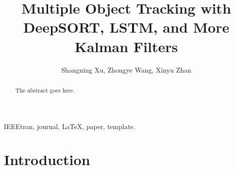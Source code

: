 \documentclass[conference]{IEEEtran}
\begin{document}
%
\title{Multiple Object Tracking with DeepSORT, LSTM, and More Kalman Filters}
%
%
%

\author{
    Shangning Xu,
    Zhongye Wang,
    Xinyu Zhan
}

%


\maketitle

\begin{abstract}
The abstract goes here.
\end{abstract}

\begin{IEEEkeywords}
IEEEtran, journal, \LaTeX, paper, template.
\end{IEEEkeywords}


\IEEEpeerreviewmaketitle



\section{Introduction}
\end{document}
